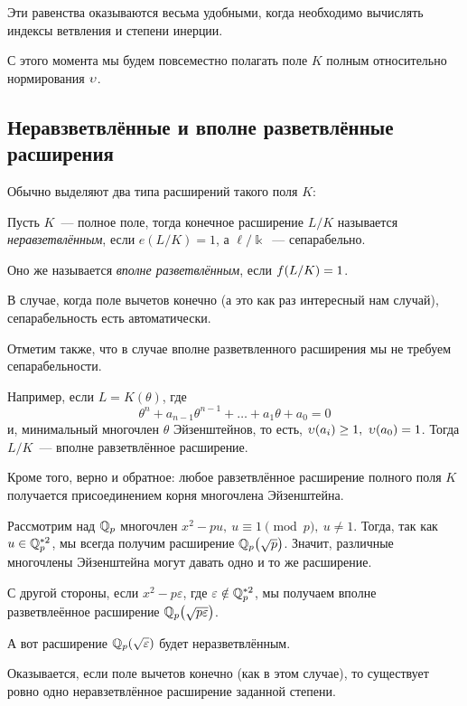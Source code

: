 	 Эти равенства оказываются весьма удобными, когда необходимо вычислять индексы ветвления и степени инерции. 

	 С этого момента мы будем повсеместно полагать поле $K$ полным относительно нормирования $\upsilon$. 

	 \subsection{Неравзветвлённые и вполне разветвлённые расширения}

	 Обычно выделяют два типа расширений такого поля $K$:

	 \begin{definition} 
	 	Пусть $K$~--- полное поле, тогда конечное расширение $L/K$ называется \emph{неравзетвлённым}, если $e(L/K) = 1$, а $\ell/\Bbbk$~--- сепарабельно. 

	 	Оно же называется \emph{вполне разветвлённым}, если $f\lr*{L/K} = 1$. 
	 \end{definition}

	 \begin{remark}
	 	В случае, когда поле вычетов конечно (а это как раз интересный нам случай), сепарабельность есть автоматически. 

	 	Отметим также, что в случае вполне разветвленного расширения мы не требуем сепарабельности. 
	 \end{remark}

	 \begin{example}
	 	Например, если $L = K(\theta)$, где 
	 	\[
	 		\theta^n + a_{n - 1}\theta^{n - 1} + \ldots + a_1 \theta + a_0 = 0
	 	\]
	 	и, минимальный многочлен $\theta$ Эйзенштейнов, то есть, $\v(a_i) \ge 1, \ \v(a_0) = 1$. Тогда $L/K$~--- вполне равзетвлённое расширение. 

	 	Кроме того, верно и обратное: любое равзетвлённое расширение полного поля $K$ получается присоединением корня многочлена Эйзенштейна. 
	 \end{example}

	 \begin{example}
	 	Рассмотрим над $\mathbb{Q}_{p}$ многочлен $x^2 - pu, \ u \equiv 1 \pmod{p}, \ u \neq 1$. Тогда, так как $u \in \mathbb{Q}_{p}^{*2}$, мы всегда получим расширение $\Q_{p}\lr*{\sqrt{p}}$. Значит, различные многочлены Эйзенштейна могут давать одно и то же расширение.  

	 	С другой стороны, если $x^2 - p \varepsilon	$, где $\varepsilon \notin \mathbb{Q}_{p}^{*2}$, мы получаем вполне разветвлеённое расширение $\Q_{p}\lr*{\sqrt{p \varepsilon}}$. 

	 	А вот расширение $\Q_{p}\lr*{\sqrt{\varepsilon}}$ будет неразветвлённым.

	 	Оказывается, если поле вычетов конечно (как в этом случае), то существует ровно одно неравзетвлённое расширение заданной степени. 
	 \end{example}

